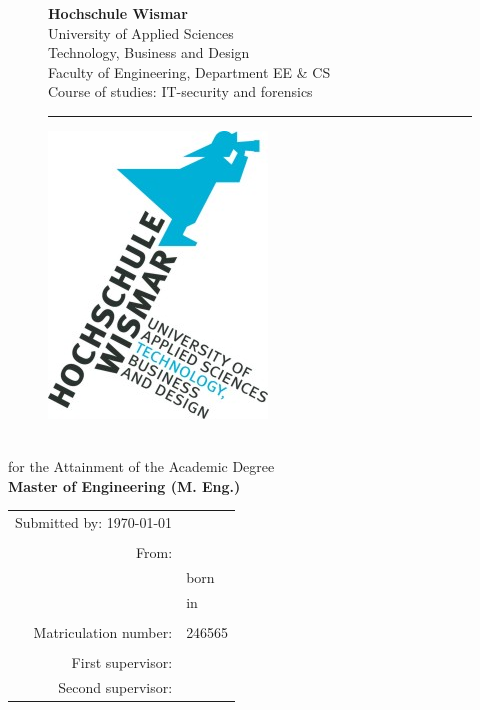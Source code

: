 \begin{titlepage}
	\setlength\headsep{-5mm}
	\begin{figure}[!h]
		\begin{minipage}{0.8\textwidth}
			\textbf{Hochschule Wismar} \\
			University of Applied Sciences \\
			Technology, Business and Design \\
			Faculty of Engineering, Department EE \&{} CS \\
			Course of studies: IT-security and forensics\\
		\rule{\textwidth}{0.5pt}
		\end{minipage}
		\begin{minipage}[r]{0.1\textwidth}
			\begin{flushright}
				\includegraphics[height=6\baselineskip]{pics/HSLogo.jpg}
			\end{flushright}
		\end{minipage}
	\end{figure}
	\vspace*{4cm}
	\begin{center}
		\Huge
		\textbf{\documentType} \\[4pt]
		\normalsize for the Attainment of the Academic Degree \\[3pt]
		\large \textbf{Master of Engineering (M. Eng.)} \\
		\vspace{2cm}
		\Large \thetitle
		\begin{table}[b]
			\begin{tabular}{rl}
				Submitted by: \today \\
				\\
				From: & \theauthor \\
				& born \birthday \\
				& in \birthplace \\
				\\
				Matriculation number: & 246565 \\
				\\
				First supervisor: & \firstTutor \\
				Second supervisor: & \secondTutor
			\end{tabular}
		\end{table}
	\end{center}
\end{titlepage}
